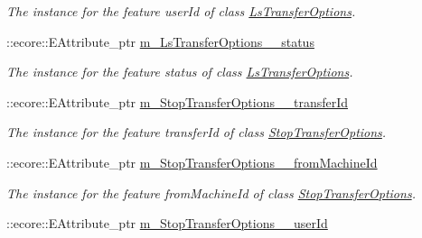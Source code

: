 \begin{DoxyCompactItemize}
\begin{DoxyCompactList}\small\item\em The instance for the feature userId of class \hyperlink{classFMS__Data_1_1LsTransferOptions}{LsTransferOptions}. \item\end{DoxyCompactList}\item 
\hypertarget{classFMS__Data_1_1FMS__DataPackage_a7793f97bd6700e46f1a51be501d8e1a2}{
::ecore::EAttribute\_\-ptr \hyperlink{classFMS__Data_1_1FMS__DataPackage_a7793f97bd6700e46f1a51be501d8e1a2}{m\_\-LsTransferOptions\_\-\_\-status}}
\label{classFMS__Data_1_1FMS__DataPackage_a7793f97bd6700e46f1a51be501d8e1a2}

\begin{DoxyCompactList}\small\item\em The instance for the feature status of class \hyperlink{classFMS__Data_1_1LsTransferOptions}{LsTransferOptions}. \item\end{DoxyCompactList}\item 
\hypertarget{classFMS__Data_1_1FMS__DataPackage_a39373a5fea49eb11683b77000ce7c024}{
::ecore::EAttribute\_\-ptr \hyperlink{classFMS__Data_1_1FMS__DataPackage_a39373a5fea49eb11683b77000ce7c024}{m\_\-StopTransferOptions\_\-\_\-transferId}}
\label{classFMS__Data_1_1FMS__DataPackage_a39373a5fea49eb11683b77000ce7c024}

\begin{DoxyCompactList}\small\item\em The instance for the feature transferId of class \hyperlink{classFMS__Data_1_1StopTransferOptions}{StopTransferOptions}. \item\end{DoxyCompactList}\item 
\hypertarget{classFMS__Data_1_1FMS__DataPackage_ae08de085cd322453243adf7b63bdbc19}{
::ecore::EAttribute\_\-ptr \hyperlink{classFMS__Data_1_1FMS__DataPackage_ae08de085cd322453243adf7b63bdbc19}{m\_\-StopTransferOptions\_\-\_\-fromMachineId}}
\label{classFMS__Data_1_1FMS__DataPackage_ae08de085cd322453243adf7b63bdbc19}

\begin{DoxyCompactList}\small\item\em The instance for the feature fromMachineId of class \hyperlink{classFMS__Data_1_1StopTransferOptions}{StopTransferOptions}. \item\end{DoxyCompactList}\item 
\hypertarget{classFMS__Data_1_1FMS__DataPackage_a96e2f551baea07e5e688d1f882b059c6}{
::ecore::EAttribute\_\-ptr \hyperlink{classFMS__Data_1_1FMS__DataPackage_a96e2f551baea07e5e688d1f882b059c6}{m\_\-StopTransferOptions\_\-\_\-userId}}
\label{classFMS__Data_1_1FMS__DataPackage_a96e2f551baea07e5e688d1f882b059c6}


\end{DoxyCompactItemize}
